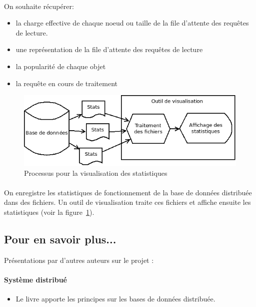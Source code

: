 \documentclass[12pt]{article}
\begin{document}
\paragraph{} On souhaite récupérer:
\begin{itemize}
 \item la charge effective de chaque noeud ou taille de la file d'attente des requêtes de lecture.
 \item une représentation de la file d'attente des requêtes de lecture
 \item la popularité de chaque objet
 \item la requête en cours de traitement
\end{itemize}

\begin{figure}[h]
	\centering
		\includegraphics[width=12cm]{images/besoins/visu.png}
	\caption{Processus pour la visualisation des statistiques \label{fig:visu}}
\end{figure}

\paragraph{} On enregistre les statistiques de fonctionnement de la base de données distribuée dans des fichiers. Un outil de visualisation traite ces fichiers et affiche ensuite les statistiques (voir la figure~\ref{fig:visu}).

\newpage
\subsection{Pour en savoir plus...}
Présentations par d'autres auteurs sur le projet :

\paragraph{Système distribué}

\begin{itemize}
\item Le livre \cite{Ozsu2011} apporte les principes sur les bases de données distribuée.

\end{itemize}
\end{document}
